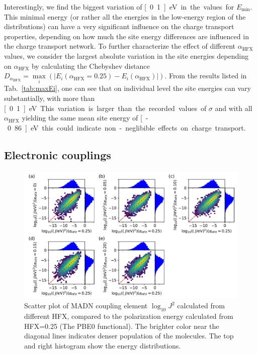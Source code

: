 \documentclass[%
 reprint,
superscriptaddress,
 amsmath,amssymb,
 aps,
prb,
floatfix
]{revtex4-2}
\newcommand{\bjoern}[2]{{\color{blue}{{\bf #1} #2}}}
\newcommand{\ahfx}{\ensuremath{\alpha_\text{HFX}}\xspace}
\begin{document}
Interestingly, we find the biggest variation of \unit[0.1]{eV} in the values for $E_\text{min}$. This minimal energy (or rather all the energies in the low-energy region of the distributions) can have a very significant influence on the charge transport properties, depending on how much the site energy differences are influenced in the charge transport network. To further characterize the effect of different \ahfx values, we consider the largest absolute variation in the site energies depending on \ahfx by calculating the Chebyshev distance $D_{\ahfx} = \max\limits_{i}(|E_i(\ahfx=0.25) - E_i(\ahfx)|)$. From the results listed in Tab.~\ref{tab:maxEi}, one can see that on individual level the site energies can vary substantially, with more than \unit[0.1]{eV}. This variation is larger than the recorded values of $\sigma$ and with all \ahfx yielding the same mean site energy of \unit[-0.86]{eV} this could indicate non-neglibible effects on charge transport. 

\subsection{Electronic couplings}

\begin{figure}[tbp]
  \centering
  \includegraphics[width=\linewidth]{figs/scatterJ_all.pdf}
  \caption{\bjoern{TODO:}{rewrite caption} Scatter plot of MADN coupling element $\log_{10} J^2$ calculated from different HFX, compared to the polarization energy calculated from HFX=0.25 (The PBE0 functional). The brighter color near the diagonal lines indicates denser population of the molecules.  The top and right histogram show the energy distributions.}
  \label{fig:J_MADN}
\end{figure}
\end{document}
